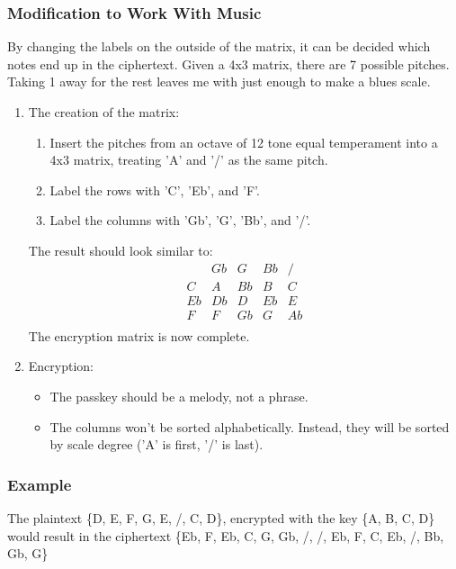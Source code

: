 \documentclass[14pt]{article}
\begin{document}
    	\subsubsection{Modification to Work With Music}
    	By changing the labels on the outside of the matrix, it can be decided which notes end up in the ciphertext. Given a 4x3 matrix, there are 7 possible pitches. Taking 1 away for the rest leaves me with just enough to make a blues scale.
    	\begin{enumerate}
    		\item The creation of the matrix:
    			\begin{enumerate}
    				\item Insert the pitches from an octave of 12 tone equal temperament into a 4x3 matrix, treating 'A' and '/' as the same pitch.
    
    				\item Label the rows with 'C', 'Eb', and 'F'.
    
    				\item Label the columns with 'Gb', 'G', 'Bb', and '/'.
    			\end{enumerate}
    			The result should look similar to:
    			\[
    				\begin{array}{c|cccc}
    					   & Gb & G  & Bb & /  \\
    					\hline
    					C  & A  & Bb & B  & C  \\
    					Eb & Db & D  & Eb & E  \\
    					F  & F  & Gb & G  & Ab \\
    				\end{array}
    			\]
    			The encryption matrix is now complete.
    
    		\item Encryption:
    			\begin{itemize}
    				\item The passkey should be a melody, not a phrase.
    
    				\item The columns won't be sorted alphabetically. Instead, they will be sorted by scale degree ('A' is first, '/' is last).
    			\end{itemize}
    	\end{enumerate}
    
    	\subsubsection{Example}
    	The plaintext \{D, E, F, G, E, /, C, D\}, encrypted with the key \{A, B, C, D\} would result in the ciphertext \{Eb, F, Eb, C, G, Gb, /, /, Eb, F, C, Eb, /,
    	Bb, Gb, G\}
\end{document}
